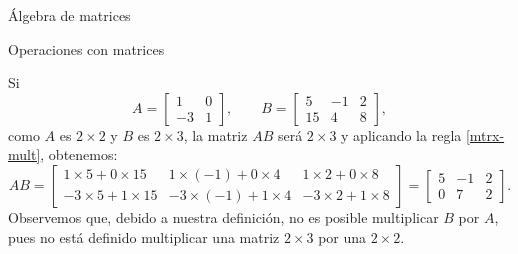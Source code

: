 \begin{chapter}{\'Algebra de matrices}
\begin{section}{Operaciones con matrices}
                \begin{ejemplo*}
                    Si 
                    \begin{equation*}
                        A = \begin{bmatrix}1&0\\-3&1\end{bmatrix}, \qquad B = \begin{bmatrix}5&-1&2\\15&4&8\end{bmatrix},
                    \end{equation*}
                    como $A$ es $2 \times 2$ y $B$ es $2 \times 3$, la matriz $AB$ será $2 \times 3$ y  aplicando la regla \eqref{mtrx-mult}, obtenemos:
                    \begin{equation*}
                        AB = \begin{bmatrix}1\times  5 + 0\times 15&1\times (-1) + 0\times 4&1\times 2 + 0\times 8
                            \\-3\times 5 + 1\times 15&-3\times (-1) + 1\times 4&-3\times 2 + 1\times 8
                        \end{bmatrix} =
                        \begin{bmatrix} 5 &-1 &2 
                            \\ 0 &7 &2
                        \end{bmatrix}.
                    \end{equation*}
                    Observemos que, debido a nuestra definición, no es posible multiplicar $B$ por $A$, pues no está definido multiplicar una matriz $2 \times 3$ por una $2 \times 2$.
                \end{ejemplo*}
                     

\end{section}
\end{chapter}
